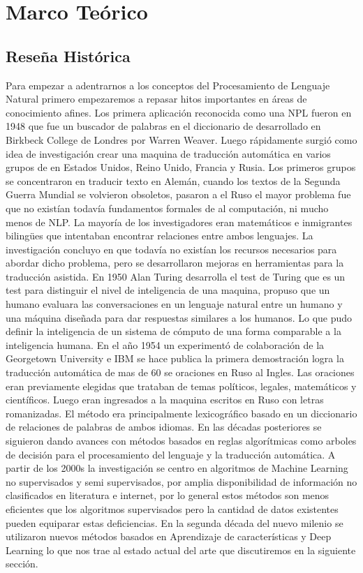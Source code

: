 \chapter[Revisión de literatura]{Marco Teórico}

\section[Reseña Histórica]{Reseña Histórica}
Para empezar a adentrarnos a los conceptos del Procesamiento de Lenguaje Natural primero
empezaremos a repasar hitos importantes en áreas de conocimiento afines.
Los primera aplicación reconocida como una NPL fueron en 1948 que fue un buscador de palabras en el
diccionario de desarrollado en Birkbeck College de Londres por Warren Weaver. Luego rápidamente
surgió como idea de investigación crear una maquina de traducción automática en varios grupos de en
Estados Unidos, Reino Unido, Francia y Rusia. Los primeros grupos se concentraron en traducir texto
en Alemán, cuando los textos de la Segunda Guerra Mundial se volvieron obsoletos, pasaron a el Ruso
el mayor problema fue que no existían todavía fundamentos formales de al computación, ni mucho
menos de NLP. La mayoría de los investigadores eran matemáticos e inmigrantes bilingües que
intentaban encontrar relaciones entre ambos lenguajes. La investigación concluyo en que todavía no
existían los recursos necesarios para abordar dicho problema, pero se desarrollaron mejoras en
herramientas para la traducción asistida.\cite{hancox}
En 1950 Alan Turing desarrolla el test de Turing que es un test para distinguir el nivel de
inteligencia de una maquina, propuso que un humano evaluara las conversaciones en un lenguaje
natural entre un humano y una máquina diseñada para dar respuestas similares a los humanos. Lo que
pudo definir la inteligencia de un sistema de cómputo de una forma comparable a la inteligencia
humana.
En el año 1954 un experimentó de colaboración de la Georgetown University e IBM se  hace publica la
primera demostración logra la traducción automática de mas de 60 se oraciones en Ruso al Ingles.
Las oraciones eran previamente elegidas que trataban de temas políticos, legales, matemáticos y
científicos. Luego eran ingresados a la maquina escritos en Ruso con letras romanizadas. El método
era principalmente lexicográfico basado en un diccionario de relaciones de palabras de ambos
idiomas.\cite{ibm_2003}
En las décadas posteriores se siguieron dando avances con métodos basados en reglas algorítmicas
como arboles de decisión para el procesamiento del lenguaje y la traducción automática. A partir de
los 2000s la investigación se centro en algoritmos de Machine Learning no supervisados y semi
supervisados, por amplia disponibilidad de información no clasificados en literatura e internet,
por lo general estos métodos son menos eficientes que los algoritmos supervisados pero la cantidad
de datos existentes pueden equiparar estas deficiencias. En la segunda década del nuevo milenio se
utilizaron nuevos métodos basados en Aprendizaje de características y Deep Learning lo que nos trae
al estado actual del arte que discutiremos en la siguiente sección.

